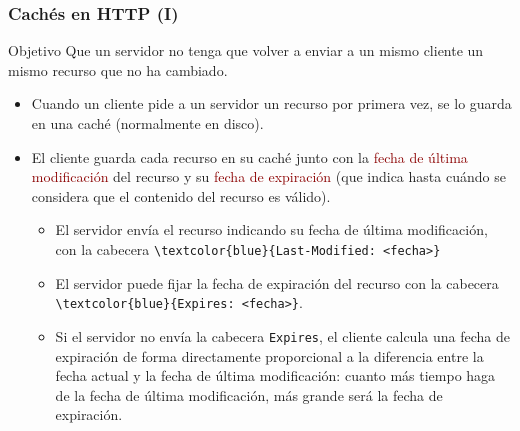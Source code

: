 \documentclass[hyperref={pdfpagelabels=true},ucs]{beamer}
\newcommand{\res}[1]{\textcolor{darkred}{#1}}
\begin{document}
\begin{frame}[fragile,shrink=12]
\frametitle{Cachés en HTTP (I)}


\begin{block}{Objetivo}
Que un servidor no tenga que volver a enviar a un
  mismo cliente un mismo recurso que no ha cambiado.
\end{block}

\begin{itemize}
\item Cuando un cliente pide a un servidor un recurso por primera vez, se
  lo guarda en una caché (normalmente en disco).
\item El cliente guarda cada recurso en su caché junto
  con la \res{fecha de última modificación} del recurso y su \res{fecha de
  expiración} (que indica hasta cuándo se considera que el contenido del
  recurso es válido).

  \begin{itemize}
  \item El servidor envía el recurso indicando su fecha de última
    modificación, con la cabecera \Verb|\textcolor{blue}{Last-Modified: <fecha>}|
  \item El servidor puede fijar la fecha de expiración del recurso con
    la cabecera \Verb|\textcolor{blue}{Expires: <fecha>}|.
  \item Si el servidor no envía la cabecera \Verb|Expires|, el cliente
    calcula una fecha de expiración de forma directamente
    proporcional a la diferencia entre la fecha actual y la fecha de
    última modificación: cuanto más tiempo haga de la fecha de última
    modificación, más grande será la fecha de expiración.
  \end{itemize}

\end{itemize}
\end{frame}


\end{document}
